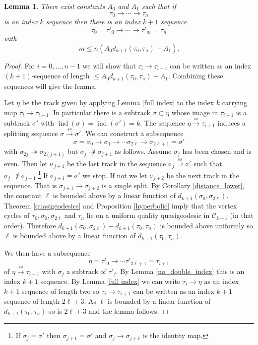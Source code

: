 \documentclass[11pt]{article}
\newtheorem{lemma}[thm]{Lemma}
\theoremstyle{remark}
\def\C{{\mathcal C}}
\def\ind{\operatorname{ind}}
\def\ss{{\overset{ss}\longrightarrow}}
\begin{document}
\begin{lemma}\label{induction step}
There exist constants $A_0$ and $A_1$ such that if
$$\tau_0 \to \cdots\to \tau_n$$
is an index $k$ sequence then there is an index $k+1$ sequence
$$\tau_0= \tau'_0 \to \cdots\to \tau'_m =\tau_n$$
with 
$$m \le n\left(A_0d_{k+1}(\tau_0, \tau_n) + A_1\right).$$
\end{lemma}

\begin{proof}
For $i=0, \dots, n-1$ we will show that $\tau_i \to \tau_{i+1}$ can be written as an index $(k+1)$-sequence of length $\le A_0d_{k+1}(\tau_0, \tau_n) + A_1$. Combining these sequences will give the lemma.

Let $\eta$ be the track given by applying Lemma \ref{full index} to the index $k$ carrying map $\tau_i \to \tau_{i+1}$. In particular there is a subtrack $\sigma \subset \eta$ whose image in $\tau_{i+1}$ is a subtrack $\sigma'$ with $\ind(\sigma) = \ind(\sigma') = k$.
The sequence $\eta \ss\tau_{i+1}$ induces a splitting sequence $\sigma \ss \sigma'$. 
We can construct a subsequence 
$$\sigma= \sigma_0 \to \sigma_1 \to \cdots \sigma_{2\ell} \to \sigma_{2\ell+1} = \sigma'$$
with $\sigma_{2j} \twoheadrightarrow \sigma_{2(j+1)}$ but $\sigma_j \not\twoheadrightarrow \sigma_{j+1}$ as follows. Assume $\sigma_j$ has been chosen and is even. Then let $\sigma_{j+1}$ be the last track in the sequence $\sigma_j\ss\sigma'$ such that  $\sigma_j \not\twoheadrightarrow\sigma_{j+1}$.\footnote{If $\sigma_j = \sigma'$ then $\sigma_{j+1} = \sigma'$ and $\sigma_j\to\sigma_{j+1}$ is the identity map.} If $\sigma_{j+1} = \sigma'$ we stop. If not we let $\sigma_{j+2}$ be the next track in the sequence. That is $\sigma_{j+1}\to \sigma_{j+2}$ is a single split.  By Corollary \ref{distance_lower}, the constant $\ell$ is bounded above by a linear function of $d_{k+1}(\sigma_0, \sigma_{2\ell})$. Theorem \ref{quasigeodesics} and Proposition \ref{hyperbolic} imply that the vertex cycles of $\tau_0, \sigma_0, \sigma_{2\ell}$ and $\tau_n$ lie on a uniform quality quasigeodesic in $\C_{k+1}$ (in that order). Therefore $d_{k+1}(\sigma_0, \sigma_{2\ell}) - d_{k+1}(\tau_0,\tau_n)$ is bounded above uniformly so $\ell$ is bounded above by a linear function of $d_{k+1}(\tau_0, \tau_n)$.

We then have a subsequence
$$\eta = \tau'_0 \to \cdots \tau'_{2\ell+1} = \tau_{i+1}$$
of $\eta\ss\tau_{i+1}$ with $\sigma_j$ a subtrack of $\tau'_j$. By Lemma \ref{no_double_index} this is an index $k+1$ sequence. By Lemma \ref{full index} we can write $\tau_i \to \eta$ as an index $k+1$ sequence of length two so $\tau_i \to \tau_{i+1}$ can be written as an index $k+1$ sequence of length $2\ell+3$. As $\ell$ is bounded by a linear function of $d_{k+1}(\tau_0, \tau_n)$ so is $2\ell+3$ and the lemma follows. \end{proof}
\end{document}
